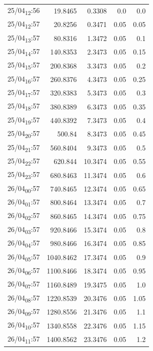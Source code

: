 \documentclass[11pt]{article}
\begin{document}
\begin{table}[htbp]
\begin{tabular}{lrrrr}
25/04\textsubscript{12}:56 & 19.8465 & 0.3308 & 0.0 & 0.0\\[0pt]
25/04\textsubscript{12}:57 & 20.8256 & 0.3471 & 0.05 & 0.05\\[0pt]
25/04\textsubscript{13}:57 & 80.8316 & 1.3472 & 0.05 & 0.1\\[0pt]
25/04\textsubscript{14}:57 & 140.8353 & 2.3473 & 0.05 & 0.15\\[0pt]
25/04\textsubscript{15}:57 & 200.8368 & 3.3473 & 0.05 & 0.2\\[0pt]
25/04\textsubscript{16}:57 & 260.8376 & 4.3473 & 0.05 & 0.25\\[0pt]
25/04\textsubscript{17}:57 & 320.8383 & 5.3473 & 0.05 & 0.3\\[0pt]
25/04\textsubscript{18}:57 & 380.8389 & 6.3473 & 0.05 & 0.35\\[0pt]
25/04\textsubscript{19}:57 & 440.8392 & 7.3473 & 0.05 & 0.4\\[0pt]
25/04\textsubscript{20}:57 & 500.84 & 8.3473 & 0.05 & 0.45\\[0pt]
25/04\textsubscript{21}:57 & 560.8404 & 9.3473 & 0.05 & 0.5\\[0pt]
25/04\textsubscript{22}:57 & 620.844 & 10.3474 & 0.05 & 0.55\\[0pt]
25/04\textsubscript{23}:57 & 680.8463 & 11.3474 & 0.05 & 0.6\\[0pt]
26/04\textsubscript{00}:57 & 740.8465 & 12.3474 & 0.05 & 0.65\\[0pt]
26/04\textsubscript{01}:57 & 800.8464 & 13.3474 & 0.05 & 0.7\\[0pt]
26/04\textsubscript{02}:57 & 860.8465 & 14.3474 & 0.05 & 0.75\\[0pt]
26/04\textsubscript{03}:57 & 920.8466 & 15.3474 & 0.05 & 0.8\\[0pt]
26/04\textsubscript{04}:57 & 980.8466 & 16.3474 & 0.05 & 0.85\\[0pt]
26/04\textsubscript{05}:57 & 1040.8462 & 17.3474 & 0.05 & 0.9\\[0pt]
26/04\textsubscript{06}:57 & 1100.8466 & 18.3474 & 0.05 & 0.95\\[0pt]
26/04\textsubscript{07}:57 & 1160.8489 & 19.3475 & 0.05 & 1.0\\[0pt]
26/04\textsubscript{08}:57 & 1220.8539 & 20.3476 & 0.05 & 1.05\\[0pt]
26/04\textsubscript{09}:57 & 1280.8556 & 21.3476 & 0.05 & 1.1\\[0pt]
26/04\textsubscript{10}:57 & 1340.8558 & 22.3476 & 0.05 & 1.15\\[0pt]
26/04\textsubscript{11}:57 & 1400.8562 & 23.3476 & 0.05 & 1.2\\[0pt]

\end{tabular}
\end{table}
\end{document}
